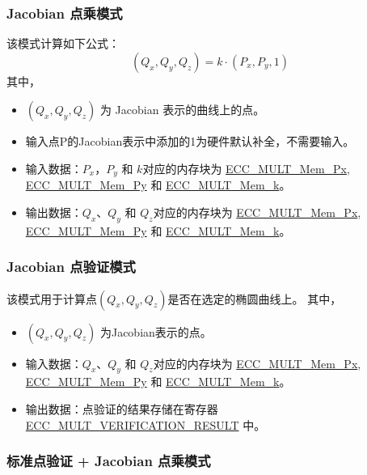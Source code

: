 \documentclass[main\_\_CN.tex]{subfiles}
\begin{document}
\subsubsection{Jacobian 点乘模式}
该模式计算如下公式： 
\[
(Q_x,Q_y,Q_z) = k \cdot (P_x,P_y,1)
\]
其中，
\begin{itemize}
    \item $(Q_x,Q_y,Q_z)$ 为 Jacobian 表示的曲线上的点。
    \item 输入点P的Jacobian表示中添加的1为硬件默认补全，不需要输入。
    \item 输入数据：$P_x$，$P_y$ 和 $k$对应的内存块为 \hyperref[tab:ecc-memory]{ECC\_MULT\_Mem\_Px}, \hyperref[tab:ecc-memory]{ECC\_MULT\_Mem\_Py} 和 \hyperref[tab:ecc-memory]{ECC\_MULT\_Mem\_k}。
    \item 输出数据：$Q_x$、$Q_y$ 和 $Q_z$对应的内存块为 \hyperref[tab:ecc-memory]{ECC\_MULT\_Mem\_Px}, \hyperref[tab:ecc-memory]{ECC\_MULT\_Mem\_Py} 和 \hyperref[tab:ecc-memory]{ECC\_MULT\_Mem\_k}。
\end{itemize}
\subsubsection{Jacobian 点验证模式}
该模式用于计算点$(Q_x,Q_y,Q_z)$是否在选定的椭圆曲线上。
其中，
\begin{itemize}
    \item $(Q_x,Q_y,Q_z)$ 为Jacobian表示的点。
    \item 输入数据：$Q_x$、$Q_y$ 和 $Q_z$对应的内存块为 \hyperref[tab:ecc-memory]{ECC\_MULT\_Mem\_Px}, \hyperref[tab:ecc-memory]{ECC\_MULT\_Mem\_Py} 和 \hyperref[tab:ecc-memory]{ECC\_MULT\_Mem\_k}。
    \item 输出数据：点验证的结果存储在寄存器 \hyperref[fielddesc:ECCMULTVERIFICATIONRESULT]{ECC\_MULT\_VERIFICATION\_RESULT} 中。
\end{itemize}

\subsubsection{标准点验证 + Jacobian 点乘模式}
\end{document}
